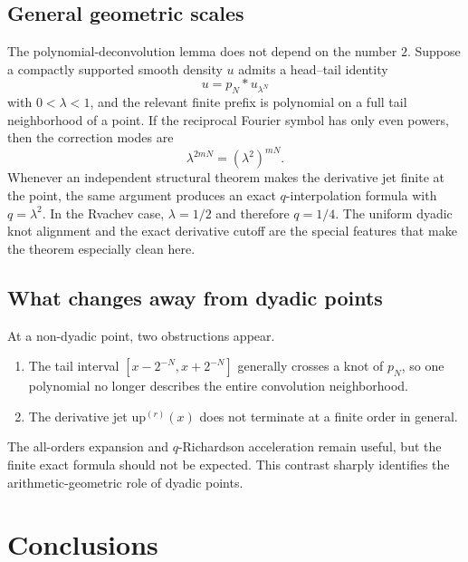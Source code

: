 \documentclass[11pt,oneside]{article}
\numberwithin{equation}{section}
\theoremstyle{definition}
\theoremstyle{remark}
\newcommand{\upf}{\mathrm{up}}
\begin{document}
\subsection{General geometric scales}

The polynomial-deconvolution lemma does not depend on the number $2$.  Suppose a
compactly supported smooth density $u$ admits a head--tail identity
\begin{equation}
 u=p_N*u_{\lambda^N}
 \label{eq:general-head-tail}
\end{equation}
with $0<\lambda<1$, and the relevant finite prefix is polynomial on a full tail
neighborhood of a point.  If the reciprocal Fourier symbol has only even powers,
then the correction modes are
\begin{equation}
 \lambda^{2mN}=(\lambda^2)^{mN}.
 \label{eq:general-modes}
\end{equation}
Whenever an independent structural theorem makes the derivative jet finite at
the point, the same argument produces an exact $q$-interpolation formula with
$q=\lambda^2$.  In the Rvachev case, $\lambda=1/2$ and therefore $q=1/4$.
The uniform dyadic knot alignment and the exact derivative cutoff are the
special features that make the theorem especially clean here.

\subsection{What changes away from dyadic points}

At a non-dyadic point, two obstructions appear.

\begin{enumerate}
\item The tail interval $[x-2^{-N},x+2^{-N}]$ generally crosses a knot of $p_N$,
so one polynomial no longer describes the entire convolution neighborhood.
\item The derivative jet $\upf^{(r)}(x)$ does not terminate at a finite order in
general.
\end{enumerate}

The all-orders expansion and $q$-Richardson acceleration remain useful, but the
finite exact formula should not be expected.  This contrast sharply identifies
the arithmetic-geometric role of dyadic points.

\section{Conclusions}
\end{document}
